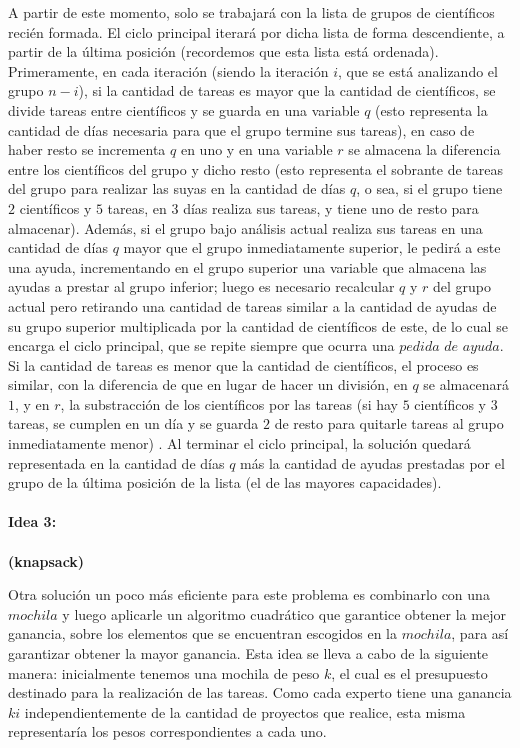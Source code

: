 \documentclass[10pt,letterpaper]{article}
\begin{document}
{ 	A partir de este momento, solo se trabajar\'a con la lista de grupos de cient\'ificos reci\'en formada. El ciclo principal iterar\'a por dicha lista de forma descendiente, a partir de la \'ultima posici\'on (recordemos que esta lista est\'a ordenada). Primeramente, en cada iteraci\'on (siendo la iteraci\'on $i$, que se est\'a analizando el grupo $n - i$), si la cantidad de tareas es mayor que la cantidad de cient\'ificos, se divide tareas entre cient\'ificos y se guarda en una variable $q$ (esto representa la cantidad de d\'ias necesaria para que el grupo termine sus tareas), en caso de haber resto se incrementa $q$ en uno y en una variable $r$ se almacena la diferencia entre los cient\'ificos del grupo y dicho resto (esto representa el sobrante de tareas del grupo para realizar las suyas en la cantidad de d\'ias $q$, o sea, si el grupo tiene $2$ cient\'ificos y $5$ tareas, en $3$ d\'ias realiza sus tareas, y tiene uno de resto para almacenar). Adem\'as, si el grupo bajo an\'alisis actual realiza sus tareas en una cantidad de d\'ias $q$ mayor que el grupo inmediatamente superior, le pedir\'a a este una ayuda, incrementando en el grupo superior una variable que almacena las ayudas a prestar al grupo inferior; luego es necesario recalcular $q$ y $r$ del grupo actual pero retirando una cantidad de tareas similar a la cantidad de ayudas de su grupo superior multiplicada por la cantidad de cient\'ificos de este, de lo cual se encarga el ciclo principal, que se repite siempre que ocurra una $pedida$ $de$ $ayuda$. Si la cantidad de tareas es menor que la cantidad de cient\'ificos, el proceso es similar, con la diferencia de que en lugar de hacer un divisi\'on, en $q$ se almacenar\'a $1$, y en $r$, la substracci\'on de los cient\'ificos por las tareas (si hay $5$ cient\'ificos y $3$ tareas, se cumplen en un d\'ia y se guarda $2$ de resto para quitarle tareas al grupo inmediatamente menor) . Al terminar el ciclo principal, la soluci\'on quedar\'a representada en la cantidad de d\'ias $q$ m\'as la cantidad de ayudas prestadas por el grupo de la \'ultima posici\'on de la lista (el de las mayores capacidades).\\ \\
 	
 	
 	{\Large \bf Idea 3:}\\ \\
 	{\small \bf (knapsack)}
 	
 	Otra soluci\'on un poco m\'as eficiente para este problema es combinarlo con una $mochila$ y luego aplicarle un algoritmo cuadr\'atico que garantice obtener la mejor ganancia, sobre los elementos que se encuentran escogidos en la $mochila$, para as\'i garantizar obtener la mayor ganancia. Esta idea se lleva a cabo de la siguiente manera: inicialmente tenemos una mochila de peso $k$, el cual es el presupuesto destinado para la realizaci\'on de las tareas. Como cada experto tiene una ganancia $ki$ independientemente de la cantidad de proyectos que realice, esta misma representar\'ia los pesos correspondientes a cada uno. 
 	
}
\end{document}
